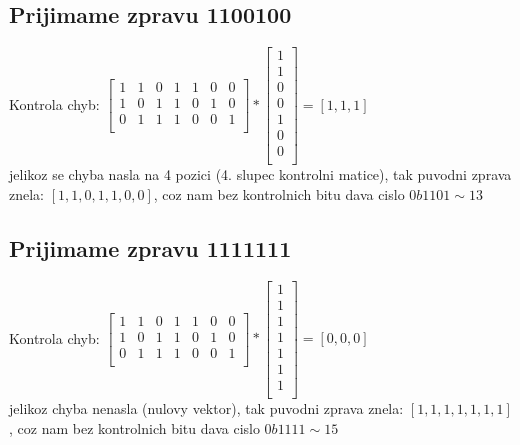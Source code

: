 \documentclass[a4paper]{article}
\begin{document}
\subsection*{Prijimame zpravu 1100100}
Kontrola chyb: $
\begin{bmatrix}
	1 & 1 & 0 & 1 & 1 & 0 & 0\\
	1 & 0 & 1 & 1 & 0 & 1 & 0\\
	0 & 1 & 1 & 1 & 0 & 0 & 1\\
\end{bmatrix}
*
\begin{bmatrix}
	1 \\
	1 \\
	0 \\
	0 \\
	1 \\
	0 \\
	0 \\
\end{bmatrix}
=
[1,1,1]
$\\
jelikoz se chyba nasla na 4 pozici (4. slupec kontrolni matice),
tak puvodni zprava znela: $[1,1,0,1,1,0,0]$,
coz nam bez kontrolnich bitu dava cislo $0b1101 \sim 13$
\\
\subsection*{Prijimame zpravu 1111111}
Kontrola chyb: $
\begin{bmatrix}
	1 & 1 & 0 & 1 & 1 & 0 & 0\\
	1 & 0 & 1 & 1 & 0 & 1 & 0\\
	0 & 1 & 1 & 1 & 0 & 0 & 1\\
\end{bmatrix}
*
\begin{bmatrix}
	1 \\
	1 \\
	1 \\
	1 \\
	1 \\
	1 \\
	1 \\
\end{bmatrix}
=
[0,0,0]
$\\
jelikoz chyba nenasla (nulovy vektor),
tak puvodni zprava znela: $[1,1,1,1,1,1,1]$,
coz nam bez kontrolnich bitu dava cislo $0b1111 \sim 15$
\\
\end{document}
